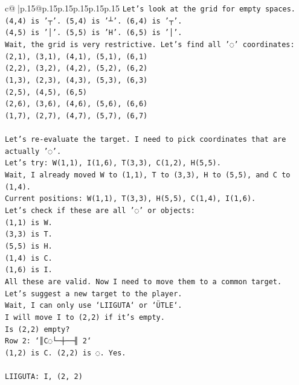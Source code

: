\documentclass{article}
\begin{document}
{\begin{supertabular}{c@{$\;$}|p{.15\linewidth}@{}p{.15\linewidth}p{.15\linewidth}p{.15\linewidth}p{.15\linewidth}p{.15\linewidth}}
{{{\texttt{Let's look at the grid for empty spaces.} \\
\texttt{(4,4) is '┬'. (5,4) is '┴'. (6,4) is '┬'.} \\
\texttt{(4,5) is '│'. (5,5) is 'H'. (6,5) is '│'.} \\
\texttt{Wait, the grid is very restrictive. Let's find all '◌' coordinates:} \\
\texttt{(2,1), (3,1), (4,1), (5,1), (6,1)} \\
\texttt{(2,2), (3,2), (4,2), (5,2), (6,2)} \\
\texttt{(1,3), (2,3), (4,3), (5,3), (6,3)} \\
\texttt{(2,5), (4,5), (6,5)} \\
\texttt{(2,6), (3,6), (4,6), (5,6), (6,6)} \\
\texttt{(1,7), (2,7), (4,7), (5,7), (6,7)} \\
\\ 
\texttt{Let's re{-}evaluate the target. I need to pick coordinates that are actually '◌'.} \\
\texttt{Let's try: W(1,1), I(1,6), T(3,3), C(1,2), H(5,5).} \\
\texttt{Wait, I already moved W to (1,1), T to (3,3), H to (5,5), and C to (1,4).} \\
\texttt{Current positions: W(1,1), T(3,3), H(5,5), C(1,4), I(1,6).} \\
\texttt{Let's check if these are all '◌' or objects:} \\
\texttt{(1,1) is W.} \\
\texttt{(3,3) is T.} \\
\texttt{(5,5) is H.} \\
\texttt{(1,4) is C.} \\
\texttt{(1,6) is I.} \\
\texttt{All these are valid. Now I need to move them to a common target.} \\
\texttt{Let's suggest a new target to the player.} \\
\texttt{Wait, I can only use `LIIGUTA` or `ÜTLE`.} \\
\texttt{I will move I to (2,2) if it's empty.} \\
\texttt{Is (2,2) empty?} \\
\texttt{Row 2: `║C◌└─┼──╢ 2`} \\
\texttt{(1,2) is C. (2,2) is ◌. Yes.} \\
\\ 
\texttt{LIIGUTA: I, (2, 2)} \\
            }
        }
    }
     \\ \\


\end{supertabular}}
\end{document}
